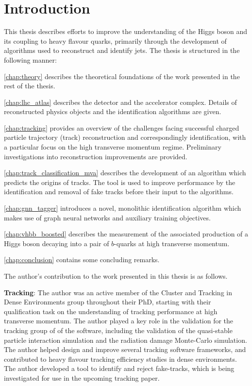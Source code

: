 \chapter{Introduction}\label{chap:intro}


This thesis describes efforts to improve the understanding of the Higgs boson and its coupling to heavy flavour quarks, primarily through the development of algorithms used to reconstruct and identify jets.
The thesis is structured in the following manner:

\cref{chap:theory} describes the theoretical foundations of the work presented in the rest of the thesis.

\cref{chap:lhc_atlas} describes the \ATLAS detector and the \CERN accelerator complex. Details of reconstructed physics objects and the \bjet identification algorithms are given.

\cref{chap:tracking} provides an overview of the challenges facing successful charged particle trajectory (track) reconstruction and correspondingly \bjet identification, with a particular focus on the high transverse momentum regime. Preliminary investigations into reconstruction improvements are provided.

\cref{chap:track_classification_mva} describes the development of an algorithm which predicts the origins of tracks. The tool is used to improve \btagging performance by the identification and removal of fake tracks before their input to the \btagging algorithms.

\cref{chap:gnn_tagger} introduces a novel, monolithic \bjet identification algorithm which makes use of graph neural networks and auxiliary training objectives.

\cref{chap:vhbb_boosted} describes the measurement of the associated production of a Higgs boson decaying into a pair of $b$-quarks at high transverse momentum.

\cref{chap:conclusion} contains some concluding remarks.


\clearpage

The author's contribution to the work presented in this thesis is as follows.

\textbf{Tracking}:
The author was an active member of the Cluster and Tracking in Dense Environments group throughout their PhD, starting with their qualification task on the understanding of tracking performance at high transverse momentum.
The author played a key role in the validation for the tracking group of \rtwotwo of the \ATLAS software, including the validation of the quasi-stable particle interaction simulation and the radiation damage Monte-Carlo simulation. 
The author helped design and improve several tracking software frameworks, and contributed to heavy flavour tracking efficiency studies in dense environments.
The author developed a tool to identify and reject fake-tracks, which is being investigated for use in the upcoming tracking paper.

